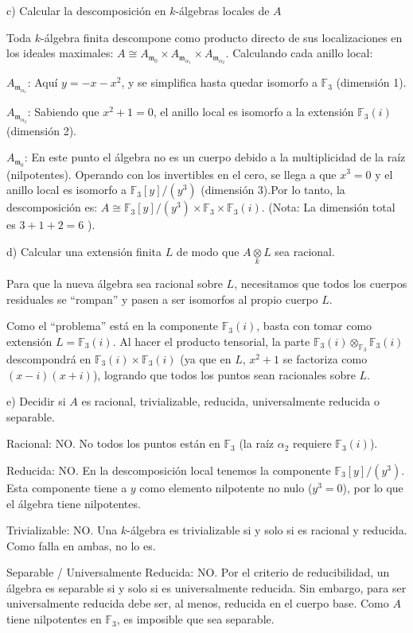 \begin{sol}
    \noindent c) Calcular la descomposición en $k$-álgebras locales de $A$
    
    Toda $k$-álgebra finita descompone como producto directo de sus localizaciones en los ideales maximales: $A \cong A_{\mathfrak{m}_0} \times A_{\mathfrak{m}_{\alpha_1}} \times A_{\mathfrak{m}_{\alpha_2}}$. Calculando cada anillo local: 
    
    $A_{\mathfrak{m}_{\alpha_1}}$: Aquí $y = -x-x^2$, y se simplifica hasta quedar isomorfo a $\mathbb{F}_3$ (dimensión 1).
    
    $A_{\mathfrak{m}_{\alpha_2}}$: Sabiendo que $x^2+1=0$, el anillo local es isomorfo a la extensión $\mathbb{F}_3(i)$ (dimensión 2).
    
    $A_{\mathfrak{m}_0}$: En este punto el álgebra no es un cuerpo debido a la multiplicidad de la raíz (nilpotentes). Operando con los invertibles en el cero, se llega a que $x^3=0$ y el anillo local es isomorfo a $\mathbb{F}_3[y]/(y^3)$ (dimensión 3).Por lo tanto, la descomposición es: $A \cong \mathbb{F}_3[y]/(y^3) \times \mathbb{F}_3 \times \mathbb{F}_3(i)$. (Nota: La dimensión total es $3+1+2=6$ ).
    
    \noindent d) Calcular una extensión finita $L$ de modo que $A\underset{k}{\otimes} L$ sea racional.
    
    Para que la nueva álgebra sea racional sobre $L$, necesitamos que todos los cuerpos residuales se ``rompan'' y pasen a ser isomorfos al propio cuerpo $L$.

    Como el ``problema'' está en la componente $\mathbb{F}_3(i)$, basta con tomar como extensión $L = \mathbb{F}_3(i)$.
    Al hacer el producto tensorial, la parte $\mathbb{F}_3(i) \otimes_{\mathbb{F}_3} \mathbb{F}_3(i)$ descompondrá en $\mathbb{F}_3(i) \times \mathbb{F}_3(i)$ (ya que en $L$, $x^2+1$ se factoriza como $(x-i)(x+i)$), logrando que todos los puntos sean racionales sobre $L$.

    \noindent e) Decidir si $A$ es racional, trivializable, reducida, universalmente reducida o separable.
    
    Racional: NO. No todos los puntos están en $\mathbb{F}_3$ (la raíz $\alpha_2$ requiere $\mathbb{F}_3(i)$).
    
    Reducida: NO. En la descomposición local tenemos la componente $\mathbb{F}_3[y]/(y^3)$. Esta componente tiene a $y$ como elemento nilpotente no nulo ($y^3=0$), por lo que el álgebra tiene nilpotentes.
    
    Trivializable: NO. Una $k$-álgebra es trivializable si y solo si es racional y reducida. Como falla en ambas, no lo es.
    
    Separable / Universalmente Reducida: NO. Por el criterio de reducibilidad, un álgebra es separable si y solo si es universalmente reducida. Sin embargo, para ser universalmente reducida debe ser, al menos, reducida en el cuerpo base. Como $A$ tiene nilpotentes en $\mathbb{F}_3$, es imposible que sea separable.
    \end{sol}
